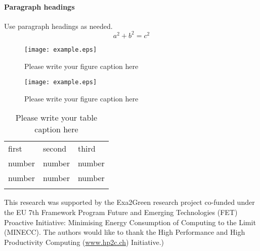 \paragraph{Paragraph headings} Use paragraph headings as needed.
\begin{equation}
a^2+b^2=c^2
\end{equation}

\begin{figure}
  \texttt{[image: example.eps]}
\caption{Please write your figure caption here}
\label{fig:1}       %
\end{figure}
%
\begin{figure*}
  \texttt{[image: example.eps]}
\caption{Please write your figure caption here}
\label{fig:2}       %
\end{figure*}
%
\begin{table}
\caption{Please write your table caption here}
\label{tab:1}       %
\begin{tabular}{lll}
\hline\noalign{\smallskip}
first & second & third  \\
\noalign{\smallskip}\hline\noalign{\smallskip}
number & number & number \\
number & number & number \\
\noalign{\smallskip}\hline
\end{tabular}
\end{table}

\begin{acknowledgements}
This  research  was  supported   by  the  Exa2Green  research  project
co-funded  under the  EU  7th Framework  Program  Future and  Emerging
Technologies (FET) Proactive Initiative: Minimising Energy Consumption
of Computing to  the Limit (MINECC).  The authors  would like to thank
the    High    Performance    and    High    Productivity    Computing
(\url{www.hp2c.ch}) Initiative.)
\end{acknowledgements}

\DeclareRobustCommand\IPCClongname{ Intergovernmental Panel on Climate Change}





